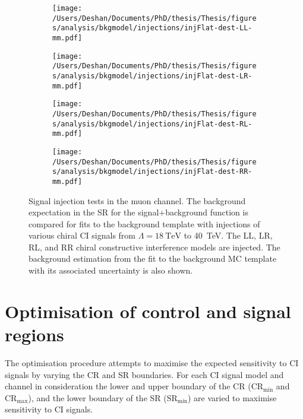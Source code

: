 \begin{figure}[h!]
    \centering
    \begin{subfigure}[b]{0.49\textwidth}
        \centering
        \texttt{[image: /Users/Deshan/Documents/PhD/thesis/Thesis/figures/analysis/bkgmodel/injections/injFlat-dest-LL-mm.pdf]}
        \label{fig:bkgmodel:injmm2}
    \end{subfigure}
    \begin{subfigure}[b]{0.49\textwidth}
        \centering
        \texttt{[image: /Users/Deshan/Documents/PhD/thesis/Thesis/figures/analysis/bkgmodel/injections/injFlat-dest-LR-mm.pdf]}
        \label{fig:bkgmodel:injmm4}
    \end{subfigure}
    \begin{subfigure}[b]{0.49\textwidth}
        \centering
        \texttt{[image: /Users/Deshan/Documents/PhD/thesis/Thesis/figures/analysis/bkgmodel/injections/injFlat-dest-RL-mm.pdf]}
        \label{fig:bkgmodel:injmm6}
    \end{subfigure}
    \begin{subfigure}[b]{0.49\textwidth}
        \centering
        \texttt{[image: /Users/Deshan/Documents/PhD/thesis/Thesis/figures/analysis/bkgmodel/injections/injFlat-dest-RR-mm.pdf]}
        \label{fig:bkgmodel:injmm8}
    \end{subfigure}
    \caption[Signal injection tests in the muon channel for destructive interference models]{Signal injection tests in the muon channel. The background expectation in the SR for the signal+background function is compared for fits to the background template with injections of various chiral CI signals from $\Lambda = \SI{18}{\tera\electronvolt}$ to \SI{40}{\tera\electronvolt}. The LL, LR, RL, and RR chiral constructive interference models are injected. The background estimation from the fit to the background MC template with its associated uncertainty is also shown.}
    \label{fig:bkgmodel:injmmdest}
\end{figure}

\clearpage

\section{Optimisation of control and signal regions}\label{sec:extrap:optimisation}
The optimisation procedure attempts to maximise the expected sensitivity to CI signals by varying the CR and SR boundaries. For each CI signal model and channel in consideration the lower and upper boundary of the CR ($\mathrm{CR}_{\mathrm{min}}$ and $\mathrm{CR}_{\mathrm{max}}$), and the lower boundary of the SR ($\mathrm{SR}_{\mathrm{min}}$) are varied to maximise sensitivity to CI signals. 

